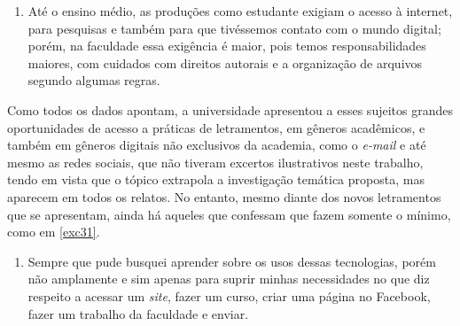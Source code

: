 \documentclass{textolivre}
\begin{document}
\begin{enumerate}[resume,label={(\arabic*)},ref={\arabic*},topsep=1ex,partopsep=1ex]
\item\label{exc30} Até o ensino médio, as produções como estudante exigiam o acesso à internet, para pesquisas e também para que tivéssemos contato com o mundo digital; porém, na faculdade essa exigência é maior, pois temos responsabilidades maiores, com cuidados com direitos autorais e a organização de arquivos segundo algumas regras.
\end{enumerate}

Como todos os dados apontam, a universidade apresentou a esses sujeitos grandes oportunidades de acesso a práticas de letramentos, em gêneros acadêmicos, e também em gêneros digitais não exclusivos da academia, como o \textit{e-mail} e até mesmo as redes sociais, que não tiveram excertos ilustrativos neste trabalho, tendo em vista que o tópico extrapola a investigação temática proposta, mas aparecem em todos os relatos. No entanto, mesmo diante dos novos letramentos que se apresentam, ainda há aqueles que confessam que fazem somente o mínimo, como em \ref{exc31}.


\begin{enumerate}[resume,label={(\arabic*)},ref={\arabic*},topsep=1ex,partopsep=1ex]
\item\label{exc31} Sempre que pude busquei aprender sobre os usos dessas tecnologias, porém não amplamente e sim apenas para suprir minhas necessidades no que diz respeito a  acessar um \textit{site}, fazer um curso, criar uma página no Facebook, fazer um trabalho da faculdade e enviar.
\end{enumerate}
\end{document}

